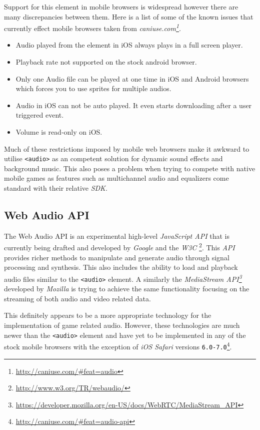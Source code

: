 \documentclass[final]{cmpreport}
\begin{document}
Support for this element in mobile browsers is widespread however there are many discrepancies between them. Here is a list of some of the known issues that currently effect mobile browsers taken from \textit{caniuse.com\footnote{\url{http://caniuse.com/\#feat=audio}}}.

\begin{itemize}
  \item Audio played from the element in iOS always plays in a full screen player.
  \item Playback rate not supported on the stock android browser.
  \item Only one Audio file can be played at one time in iOS and Android browsers which forces you to use sprites for multiple audios.
  \item Audio in iOS can not be auto played. It even starts downloading after a user triggered event.
  \item Volume is read-only on iOS.
\end{itemize}

Much of these restrictions imposed by mobile web browsers make it awkward to utilise \texttt{<audio>} as an competent solution for dynamic sound effects and background music. This also poses a problem when trying to compete with native mobile games as features such as multichannel audio and equalizers come standard with their relative \textit{SDK}.

\subsection{Web Audio API}
The Web Audio API is an experimental high-level \textit{JavaScript API} that is currently being drafted and developed by \textit{Google} and the \textit{W3C} \footnote{\url{http://www.w3.org/TR/webaudio/}}. This \textit{API} provides richer methods to manipulate and generate audio through signal processing and synthesis. This also includes the ability to load and playback audio files similar to the \texttt{<audio>} element. A similarly the \textit{MediaStream API\footnote{\url{https://developer.mozilla.org/en-US/docs/WebRTC/MediaStream_API}}} developed by \textit{Mozilla} is trying to achieve the same functionality focusing on the streaming of both audio and video related data.

This definitely appears to be a more appropriate technology for the implementation of game related audio. However, these technologies are much newer than the \texttt{<audio>} element and have yet to be implemented in any of the stock mobile browsers with the exception of \textit{iOS Safari} versions \texttt{6.0-7.0}\footnote{\url{http://caniuse.com/\#feat=audio-api}}.
\end{document}
